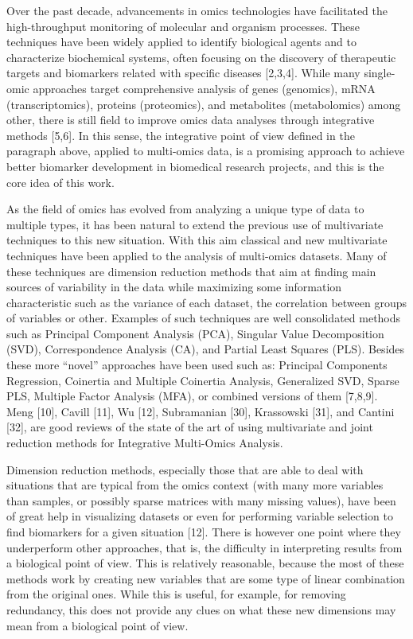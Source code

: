 \documentclass[a4paper, nobind]{templates/ociamthesis}
\begin{document}
Over the past decade, advancements in omics technologies have facilitated the high-throughput monitoring of molecular and organism processes. These techniques have been widely applied to identify biological agents and to characterize biochemical systems, often focusing on the discovery of therapeutic targets and biomarkers related with specific diseases {[}2,3,4{]}. While many single-omic approaches target comprehensive analysis of genes (genomics), mRNA (transcriptomics), proteins (proteomics), and metabolites (metabolomics) among other, there is still field to improve omics data analyses through integrative methods {[}5,6{]}. In this sense, the integrative point of view defined in the paragraph above, applied to multi-omics data, is a promising approach to achieve better biomarker development in biomedical research projects, and this is the core idea of this work.

As the field of omics has evolved from analyzing a unique type of data to multiple types, it has been natural to extend the previous use of multivariate techniques to this new situation. With this aim classical and new multivariate techniques have been applied to the analysis of multi-omics datasets. Many of these techniques are dimension reduction methods that aim at finding main sources of variability in the data while maximizing some information characteristic such as the variance of each dataset, the correlation between groups of variables or other. Examples of such techniques are well consolidated methods such as Principal Component Analysis (PCA), Singular Value Decomposition (SVD), Correspondence Analysis (CA), and Partial Least Squares (PLS). Besides these more ``novel'' approaches have been used such as: Principal Components Regression, Coinertia and Multiple Coinertia Analysis, Generalized SVD, Sparse PLS, Multiple Factor Analysis (MFA), or combined versions of them {[}7,8,9{]}. Meng {[}10{]}, Cavill {[}11{]}, Wu {[}12{]}, Subramanian {[}30{]}, Krassowski {[}31{]}, and Cantini {[}32{]}, are good reviews of the state of the art of using multivariate and joint reduction methods for Integrative Multi-Omics Analysis.

Dimension reduction methods, especially those that are able to deal with situations that are typical from the omics context (with many more variables than samples, or possibly sparse matrices with many missing values), have been of great help in visualizing datasets or even for performing variable selection to find biomarkers for a given situation {[}12{]}. There is however one point where they underperform other approaches, that is, the difficulty in interpreting results from a biological point of view. This is relatively reasonable, because the most of these methods work by creating new variables that are some type of linear combination from the original ones. While this is useful, for example, for removing redundancy, this does not provide any clues on what these new dimensions may mean from a biological point of view.
\end{document}

